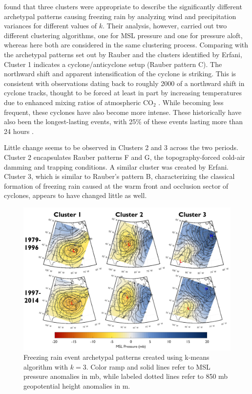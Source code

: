\documentclass[twocol]{ametsoc}
\begin{document}
\citet{erfani2012automated} found that three clusters were appropriate to describe the significantly different archetypal patterns causing freezing rain by analyzing wind and precipitation variances for different values of $k$. Their analysis, however, carried out two different clustering algorithms, one for MSL pressure and one for pressure aloft, whereas here both are considered in the same clustering process. 
Comparing with the archetypal patterns set out by Rauber and the clusters identified by Erfani, Cluster 1 indicates a cyclone/anticyclone setup (Rauber pattern C). The northward shift and apparent intensification of the cyclone is striking. This is consistent with observations dating back to roughly 2000 of a northward shift in cyclone tracks, thought to be forced at least in part by increasing temperatures due to enhanced mixing ratios of atmospheric CO$_2$ \citep{mccabe2001trends}. While becoming less frequent, these cyclones have also become more intense. These historically have also been the longest-lasting events, with 25\% of these events lasting more than 24 hours \citep{rauber2001synoptic}. 

Little change seems to be observed in Clusters 2 and 3 across the two periods. Cluster 2 encapsulates Rauber patterns F and G, the topography-forced cold-air damming and trapping conditions. A similar cluster was created by Erfani. Cluster 3, which is similar to Rauber's pattern B, characterizing the classical formation of freezing rain caused at the warm front and occlusion sector of cyclones, appears to have changed little as well.

\begin{figure}
\centering
\includegraphics[width=\textwidth]{Clusters.PNG}
\caption{\label{fig:clusters} Freezing rain event archetypal patterns created using k-means algorithm with $k=3$. Color ramp and solid lines refer to MSL pressure anomalies in mb, while labeled dotted lines refer to 850 mb geopotential height anomalies in m.}
\end{figure}
\end{document}
